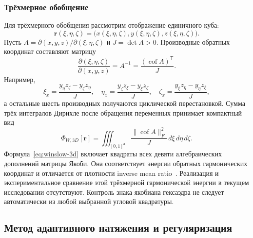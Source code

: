 \documentclass[11pt,a4paper]{article}
\newcommand{\vect}[1]{\boldsymbol{#1}}
\begin{document}
\subsubsection{Трёхмерное обобщение}

Для трёхмерного обобщения рассмотрим отображение единичного куба:
\[
\vect r(\xi,\eta,\zeta)
=\bigl(x(\xi,\eta,\zeta),y(\xi,\eta,\zeta),z(\xi,\eta,\zeta)\bigr).
\]
Пусть \(A=\partial(x,y,z)/\partial(\xi,\eta,\zeta)\) и
\(J=\det A>0\). Производные обратных координат составляют матрицу
\[
\frac{\partial(\xi,\eta,\zeta)}{\partial(x,y,z)}
=A^{-1}=\frac{(\operatorname{cof}A)^{\mathsf T}}{J}.
\]
Например,
\[
\xi_x=\frac{y_\eta z_\zeta-y_\zeta z_\eta}{J},\quad
\eta_x=\frac{y_\zeta z_\xi-y_\xi z_\zeta}{J},\quad
\zeta_x=\frac{y_\xi z_\eta-y_\eta z_\xi}{J},
\]
а остальные шесть производных получаются циклической перестановкой.
Сумма трёх интегралов Дирихле после обращения переменных принимает
компактный вид
\begin{equation}
\Phi_{W,3D}[\vect r]
=\iiint_{[0,1]^3}
\frac{\lVert\operatorname{cof}A\rVert_F^2}{J}
\,d\xi\,d\eta\,d\zeta.
\label{eq:winslow-3d}
\end{equation}
Формула~\eqref{eq:winslow-3d} включает квадраты всех девяти алгебраических
дополнений матрицы Якоби. Она соответствует энергии обратных гармонических
координат и отличается от плотности inverse mean ratio~\cite{knupp2001}.
Реализация и экспериментальное сравнение этой трёхмерной гармонической
энергии в текущем исследовании отсутствуют. Контроль знака якобиана
гексаэдра не следует автоматически из любой выбранной угловой квадратуры.

\subsection{Метод адаптивного натяжения и регуляризация}
\end{document}
